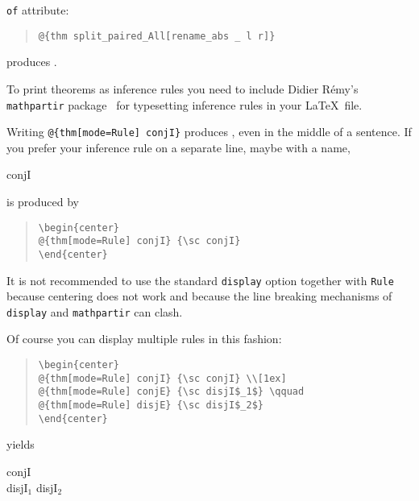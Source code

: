 \begin{isabellebody}
\begin{isamarkuptext}
\texttt{of} attribute:
\begin{quote}
\verb!@!\verb!{thm split_paired_All[rename_abs _ l r]}!
\end{quote}
produces .%
\end{isamarkuptext}%
\isamarkuptrue%
%
\isamarkuptrue%
%
\begin{isamarkuptext}%
To print theorems as inference rules you need to include Didier
R\'emy's \texttt{mathpartir} package~\cite{mathpartir}
for typesetting inference rules in your \LaTeX\ file.

Writing \verb!@!\verb!{thm[mode=Rule] conjI}! produces
, even in the middle of a sentence.
If you prefer your inference rule on a separate line, maybe with a name,
\begin{center}
 {\sc conjI}
\end{center}
is produced by
\begin{quote}
\verb!\begin{center}!\\
\verb!@!\verb!{thm[mode=Rule] conjI} {\sc conjI}!\\
\verb!\end{center}!
\end{quote}
It is not recommended to use the standard \texttt{display} option
together with \texttt{Rule} because centering does not work and because
the line breaking mechanisms of \texttt{display} and \texttt{mathpartir} can
clash.

Of course you can display multiple rules in this fashion:
\begin{quote}
\verb!\begin{center}!\\
\verb!@!\verb!{thm[mode=Rule] conjI} {\sc conjI} \\[1ex]!\\
\verb!@!\verb!{thm[mode=Rule] conjE} {\sc disjI$_1$} \qquad!\\
\verb!@!\verb!{thm[mode=Rule] disjE} {\sc disjI$_2$}!\\
\verb!\end{center}!
\end{quote}
yields
\begin{center}\small
{} {\sc conjI} \\[1ex]
 {\sc disjI$_1$} \qquad
{} {\sc disjI$_2$}
\end{center}


\end{isamarkuptext}
\end{isabellebody}
